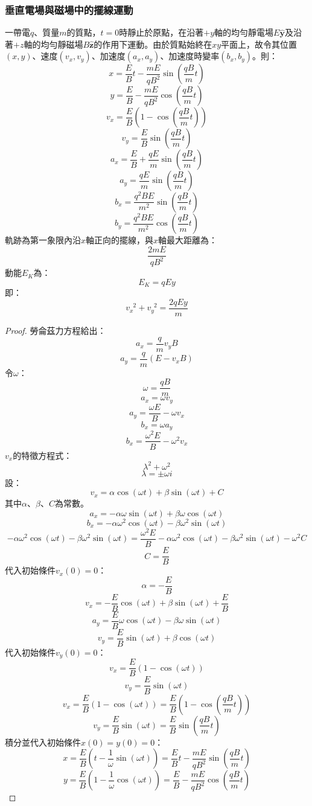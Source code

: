 \documentclass[a4paper,12pt]{report}
\begin{document}
\begin{itemize}
\subsubsection{垂直電場與磁場中的擺線運動}
一帶電$q$、質量$m$的質點，$t=0$時靜止於原點，在沿著$+y$軸的均勻靜電場$E\hat{\mathbf{y}}$及沿著$+z$軸的均勻靜磁場$B\hat{\mathbf{z}}$的作用下運動。由於質點始終在$xy$平面上，故令其位置$(x,y)$、速度$(v_x,v_y)$、加速度$(a_x,a_y)$、加速度時變率$(b_x,b_y)$。則：
\[x=\frac{E}{B}t-\frac{mE}{qB^2}\sin\left(\frac{qB}{m}t\right)\]
\[y=\frac{E}{B}-\frac{mE}{qB^2}\cos\left(\frac{qB}{m}t\right)\]
\[v_x=\frac{E}{B}\left(1-\cos\left(\frac{qB}{m}t\right)\right)\]
\[v_y=\frac{E}{B}\sin\left(\frac{qB}{m}t\right)\]
\[a_x=\frac{E}{B}+\frac{qE}{m}\sin\left(\frac{qB}{m}t\right)\]
\[a_y=\frac{qE}{m}\sin\left(\frac{qB}{m}t\right)\]
\[b_x=\frac{q^2BE}{m^2}\sin\left(\frac{qB}{m}t\right)\]
\[b_y=\frac{q^2BE}{m^2}\cos\left(\frac{qB}{m}t\right)\]
軌跡為第一象限內沿$x$軸正向的擺線，與$x$軸最大距離為：
\[\frac{2mE}{qB^2}\]
動能$E_K$為：
\[E_K=qEy\]
即：
\[v_x^{\phantom{x}2}+v_y^{\phantom{y}2}=\frac{2qEy}{m}\]
\begin{proof}
勞侖茲力方程給出：
\[a_x=\frac{q}{m}v_yB\]
\[a_y=\frac{q}{m}(E-v_xB)\]
令$\omega$：
\[\omega=\frac{qB}{m}\]
\[a_x=\omega v_y\]
\[a_y=\frac{\omega E}{B}-\omega v_x\]
\[b_x=\omega a_y\]
\[b_x=\frac{\omega^2E}{B}-\omega^2v_x\]
$v_x$的特徵方程式：
\[\lambda^2+\omega^2\]
\[\lambda=\pm\omega i\]
設：
\[v_x=\alpha\cos(\omega t)+\beta\sin(\omega t)+C\]
其中$\alpha$、$\beta$、$C$為常數。
\[a_x=-\alpha\omega\sin(\omega t)+\beta\omega\cos(\omega t)\]
\[b_x=-\alpha\omega^2\cos(\omega t)-\beta\omega^2\sin(\omega t)\]
\[-\alpha\omega^2\cos(\omega t)-\beta\omega^2\sin(\omega t)=\frac{\omega^2E}{B}-\alpha\omega^2\cos(\omega t)-\beta\omega^2\sin(\omega t)-\omega^2C\]
\[C=\frac{E}{B}\]
代入初始條件$v_x(0)=0$：
\[\alpha=-\frac{E}{B}\]
\[v_x=-\frac{E}{B}\cos(\omega t)+\beta\sin(\omega t)+\frac{E}{B}\]
\[a_y=\frac{E}{B}\omega\cos(\omega t)-\beta\omega\sin(\omega t)\]
\[v_y=\frac{E}{B}\sin(\omega t)+\beta\cos(\omega t)\]
代入初始條件$v_y(0)=0$：
\[v_x=\frac{E}{B}(1-\cos(\omega t))\]
\[v_y=\frac{E}{B}\sin(\omega t)\]
\[v_x=\frac{E}{B}(1-\cos(\omega t))=\frac{E}{B}\left(1-\cos\left(\frac{qB}{m}t\right)\right)\]
\[v_y=\frac{E}{B}\sin(\omega t)=\frac{E}{B}\sin\left(\frac{qB}{m}t\right)\]
積分並代入初始條件$x(0)=y(0)=0$：
\[x=\frac{E}{B}\left(t-\frac{1}{\omega}\sin(\omega t)\right)=\frac{E}{B}t-\frac{mE}{qB^2}\sin\left(\frac{qB}{m}t\right)\]
\[y=\frac{E}{B}\left(1-\frac{1}{\omega}\cos(\omega t)\right)=\frac{E}{B}-\frac{mE}{qB^2}\cos\left(\frac{qB}{m}t\right)\]
\end{proof}

\end{itemize}
\end{document}

